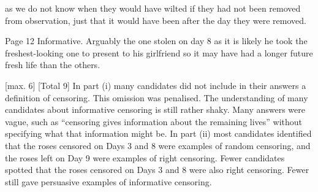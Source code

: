 as we do not know when they would have wilted if they had not been
removed from observation, just that it would have been after the day they were
removed.

Page 12
Informative.
Arguably the one stolen on day 8
as it is likely he took the freshest-looking one to present to his girlfriend
so it may have had a longer future fresh life than the others.



[max. 6]
[Total 9]
In part (i) many candidates did not include in their answers a
definition of censoring. This omission was penalised. The
understanding of many candidates about informative censoring is
still rather shaky. Many answers were vague, such as “censoring
gives information about the remaining lives” without specifying
what that information might be. In part (ii) most candidates
identified that the roses censored on Days 3 and 8 were examples
of random censoring, and the roses left on Day 9 were examples of
right censoring. Fewer candidates spotted that the roses censored
on Days 3 and 8 were also right censoring. Fewer still gave
persuasive examples of informative censoring.
